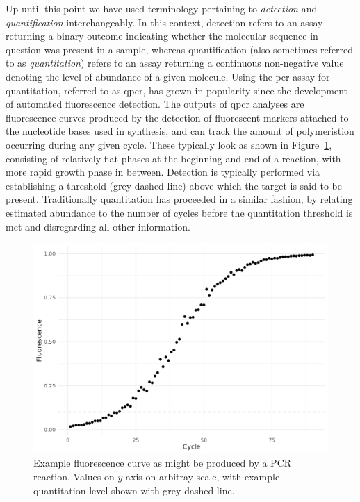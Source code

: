 \documentclass[thesis.tex]{subfiles}
\begin{document}
Up until this point we have used terminology pertaining to \emph{detection} and \emph{quantification} interchangeably. In this context, detection refers to an assay returning a binary outcome indicating whether the molecular sequence in question was present in a sample, whereas quantification (also sometimes referred to as \emph{quantitation}) refers to an assay returning a continuous non-negative value denoting the level of abundance of a given molecule. Using the \gls{pcr} assay for quantitation, referred to as \gls{qpcr}, has grown in popularity since the development of automated fluorescence detection. The outputs of \gls{qpcr} analyses are fluorescence curves produced by the detection of fluorescent markers attached to the nucleotide bases used in synthesis, and can track the amount of polymeristion occurring during any given cycle. These typically look as shown in Figure~\ref{fig:sim_fluor_fig}, consisting of relatively flat phases at the beginning and end of a reaction, with more rapid growth phase in between. Detection is typically performed via establishing a threshold (grey dashed line) above which the target is said to be present. Traditionally quantitation has proceeded in a similar fashion, by relating estimated abundance to the number of cycles before the quantitation threshold is met and disregarding all other information.

\begin{figure}
    \centering
    \includegraphics[width=5in]{figures/chapter1/sim_fluor_fig.png}
    \caption{Example fluorescence curve as might be produced by a PCR reaction. Values on $y$-axis on arbitray scale, with example quantitation level shown with grey dashed line.}
    \label{fig:sim_fluor_fig}
\end{figure}
\end{document}
